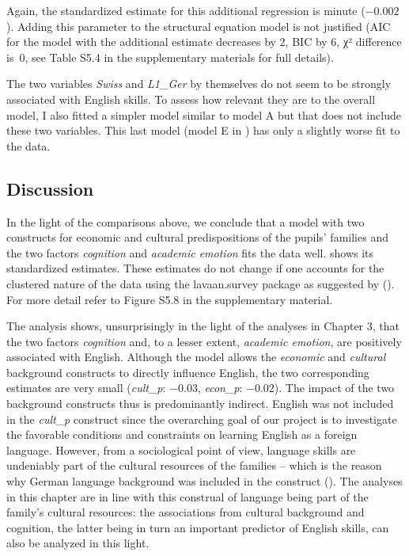 \documentclass[output=paper]{langsci/langscibook}
\begin{document}
\begin{sloppypar}
Again, the standardized estimate for this additional regression is minute ($-0.002$). Adding this parameter to the structural equation model is not justified (AIC for the model with the additional estimate decreases by 2, BIC by 6, χ² difference is~0, see Table S5.4 in the supplementary materials for full details).
\end{sloppypar}

The two variables \textit{Swiss} and \textit{L1\_Ger} by themselves do not seem to be strongly associated with English skills. To assess how relevant they are to the overall model, I also fitted a simpler model similar to model A but that does not include these two variables. This last model (model E in ) has only a slightly worse fit to the data.

\subsection{Discussion}

In the light of the comparisons above, we conclude that a model with two constructs for economic and cultural predispositions of the pupils’ families and the two factors \textit{cognition} and \textit{academic emotion} fits the data well.  shows its standardized estimates. These estimates do not change if one accounts for the clustered nature of the data using the lavaan.survey package as suggested by \citeauthor{Oberski2014} (\citeyear{Oberski2014}). For more detail refer to Figure S5.8 in the supplementary material.

The analysis shows, unsurprisingly in the light of the analyses in Chapter 3, that the two factors \textit{cognition} and, to a lesser extent, \textit{academic emotion}, are positively associated with English. Although the model allows the \textit{economic} and \textit{cultural} background constructs to directly influence English, the two corresponding estimates are very small (\textit{cult\_p}: $-0.03$, \textit{econ\_p}: $-0.02$). The impact of the two background constructs thus is predominantly indirect. English was not included in the \textit{cult\_p} construct since the overarching goal of our project is to investigate the favorable conditions and constraints on learning English as a foreign language. However, from a sociological point of view, language skills are undeniably part of the cultural resources of the families -- which is the reason why German language background was included in the construct (). The analyses in this chapter are in line with this construal of language being part of the family’s cultural resources: the associations from cultural background and cognition, the latter being in turn an important predictor of English skills, can also be analyzed in this light.
\end{document}
